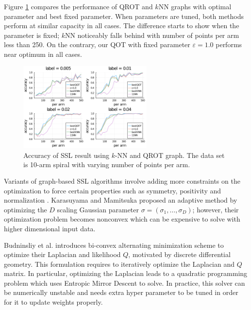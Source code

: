 \documentclass{article}
\begin{document}
Figure \ref{fig:QOT_KNN_Best} compares the performance of QROT and $k$NN graphs with optimal parameter and best fixed parameter. 
When parameters are tuned, both methods perform at similar capacity in all cases.
The difference starts to show when the parameter is fixed; $k$NN noticeably falls behind with number of points per arm less than 250. 
On the contrary, our QOT with fixed parameter $\varepsilon = 1.0$ performs near optimum in all cases.

\begin{figure}[h]
    \centering
    \includegraphics[width=0.6\textwidth]{LaTeX/figures/QOT10_KNNbest.png}
    \caption{Accuracy of SSL result using $k$-NN and QROT graph. The data set is 10-arm spiral with varying number of points per arm.}
    \label{fig:QOT_KNN_Best}
\end{figure}

Variants of graph-based SSL algorithms involve adding more constraints on the optimization to force certain properties such as symmetry, positivity and normalization \cite{wang2007label}. 
Karasuyama and Mamitsuka \cite{karasuyama2017adaptive} proposed an adaptive method by optimizing the $D$ scaling Gaussian parameter $\sigma = (\sigma_1, \ldots, \sigma_D)$; however, their optimization problem becomes nonconvex which can be expensive to solve with higher dimensional input data.

Budninsliy et al. \cite{budninskiy2020laplacian} introduces bi-convex alternating minimization scheme to optimize their Laplacian and likelihood $Q$, motivated by discrete differential geometry. 
This formulation requires to iteratively optimize the Laplacian and $Q$ matrix. 
In particular, optimizing the Laplacian leads to a quadratic programming problem which uses Entropic Mirror Descent to solve. 
In practice, this solver can be numerically unstable and needs extra hyper parameter to be tuned in order for it to update weights properly. 
\end{document}
